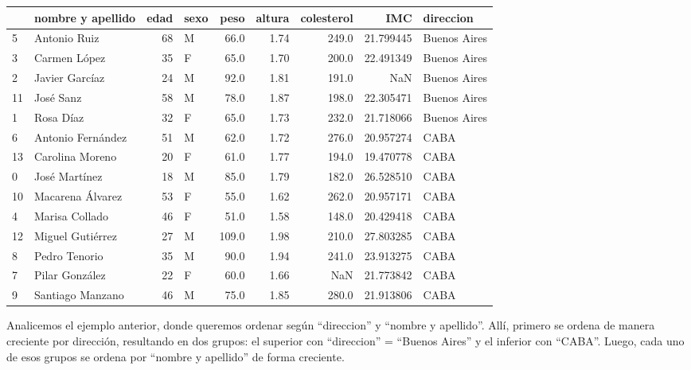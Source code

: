 \documentclass[
  letterpaper,
  DIV=11,
  numbers=noendperiod]{scrreprt}
\begin{document}
\begin{tabular}{llrlrrrrl}
\toprule
{} &  nombre y apellido &  edad & sexo &   peso &  altura &  colesterol &        IMC &     direccion \\
\midrule
5  &       Antonio Ruiz &    68 &    M &   66.0 &    1.74 &       249.0 &  21.799445 &  Buenos Aires \\
3  &       Carmen López &    35 &    F &   65.0 &    1.70 &       200.0 &  22.491349 &  Buenos Aires \\
2  &     Javier Garcíaz &    24 &    M &   92.0 &    1.81 &       191.0 &        NaN &  Buenos Aires \\
11 &          José Sanz &    58 &    M &   78.0 &    1.87 &       198.0 &  22.305471 &  Buenos Aires \\
1  &          Rosa Díaz &    32 &    F &   65.0 &    1.73 &       232.0 &  21.718066 &  Buenos Aires \\
6  &  Antonio Fernández &    51 &    M &   62.0 &    1.72 &       276.0 &  20.957274 &          CABA \\
13 &    Carolina Moreno &    20 &    F &   61.0 &    1.77 &       194.0 &  19.470778 &          CABA \\
0  &      José Martínez &    18 &    M &   85.0 &    1.79 &       182.0 &  26.528510 &          CABA \\
10 &   Macarena Álvarez &    53 &    F &   55.0 &    1.62 &       262.0 &  20.957171 &          CABA \\
4  &     Marisa Collado &    46 &    F &   51.0 &    1.58 &       148.0 &  20.429418 &          CABA \\
12 &   Miguel Gutiérrez &    27 &    M &  109.0 &    1.98 &       210.0 &  27.803285 &          CABA \\
8  &      Pedro Tenorio &    35 &    M &   90.0 &    1.94 &       241.0 &  23.913275 &          CABA \\
7  &     Pilar González &    22 &    F &   60.0 &    1.66 &         NaN &  21.773842 &          CABA \\
9  &   Santiago Manzano &    46 &    M &   75.0 &    1.85 &       280.0 &  21.913806 &          CABA \\
\bottomrule
\end{tabular}

Analicemos el ejemplo anterior, donde queremos ordenar según
``direccion'' y ``nombre y apellido''. Allí, primero se ordena de manera
creciente por dirección, resultando en dos grupos: el superior con
``direccion'' = ``Buenos Aires'' y el inferior con ``CABA''. Luego, cada
uno de esos grupos se ordena por ``nombre y apellido'' de forma
creciente.
\end{document}
